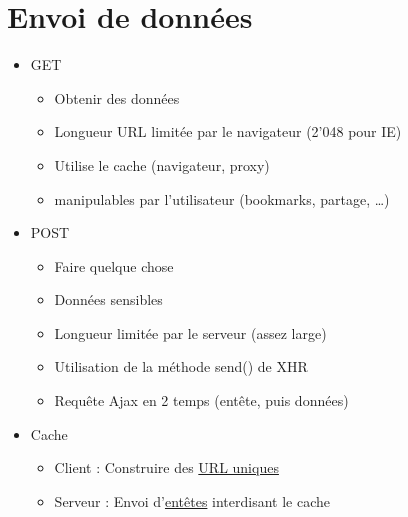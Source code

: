 \hypertarget{envoi-de-donnuxe9es}{%
\section{Envoi de données}\label{envoi-de-donnuxe9es}}

\begin{itemize}
\tightlist
\item
  GET

  \begin{itemize}
  \tightlist
  \item
    {Obtenir des données}
  \item
    Longueur URL limitée par le navigateur (2'048 pour IE)
  \item
    Utilise le cache (navigateur, proxy)
  \item
    manipulables par l'utilisateur (bookmarks, partage, \ldots{})
  \end{itemize}
\item
  POST

  \begin{itemize}
  \tightlist
  \item
    {Faire quelque chose}
  \item
    Données sensibles
  \item
    Longueur limitée par le serveur (assez large)
  \item
    Utilisation de la méthode send() de XHR
  \item
    Requête Ajax en 2 temps (entête, puis données)
  \end{itemize}
\item
  Cache

  \begin{itemize}
  \tightlist
  \item
    Client : Construire des
    \href{http://stackoverflow.com/questions/367786/prevent-browser-caching-of-jquery-ajax-call-result}{URL
    uniques}
  \item
    Serveur : Envoi
    d'\href{https://developers.google.com/web/fundamentals/performance/optimizing-content-efficiency/http-caching}{entêtes}
    interdisant le cache
  \end{itemize}
\end{itemize}

